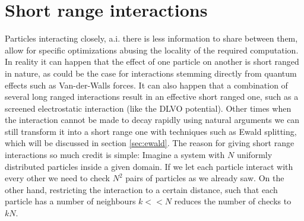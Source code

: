 \documentclass[ twoside,openright,titlepage,numbers=noenddot,%
headinclude,footinclude,cleardoublepage=empty,abstract=on,
BCOR=5mm,paper=a4,fontsize=11pt, dvipsnames
]{scrreprt}
\begin{document}
\chapter{Short range interactions}
Particles interacting closely, a.i. there is less information to share between them, allow for specific optimizations abusing the locality of the required computation.
In reality it can happen that the effect of one particle on another is short ranged in nature, as could be the case for interactions stemming directly from quantum effects such as Van-der-Walls forces. It can also happen that a combination of several long ranged interactions result in an effective short ranged one, such as a screened electrostatic interaction (like the DLVO potential). Other times when the interaction cannot be made to decay rapidly using natural arguments we can still transform it into a short range one with techniques such as Ewald splitting, which will be discussed in section \ref{sec:ewald}.
The reason for giving short range interactions so much credit is simple: Imagine a system with $N$ uniformly distributed particles inside a given domain. If we let each particle interact with every other we need to check $N^2$ pairs of particles as we already saw. On the other hand, restricting the interaction to a certain distance, such that each particle has a number of neighbours $k<<N$ reduces the number of checks to $kN$.
\end{document}
